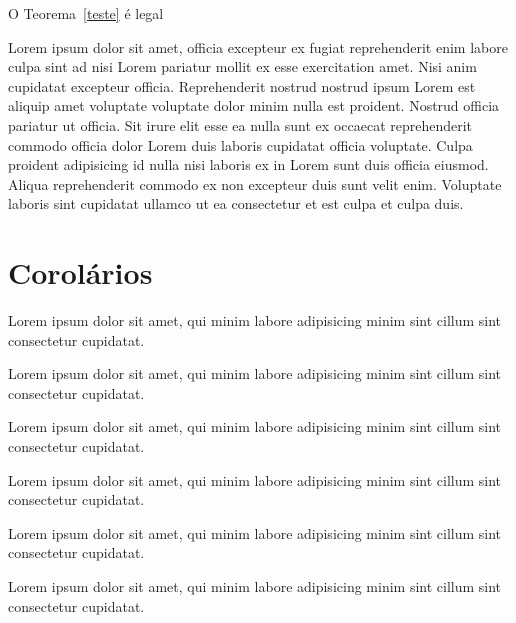 \documentclass[12pt]{../libellum}
\begin{document}
O Teorema~\ref{teste} é legal

 Lorem ipsum dolor sit amet, officia excepteur ex fugiat reprehenderit 
 enim labore culpa sint ad nisi Lorem pariatur mollit ex esse exercitation 
 amet. 
 Nisi anim cupidatat excepteur officia. 
 Reprehenderit nostrud nostrud ipsum Lorem est aliquip amet voluptate 
 voluptate dolor minim nulla est proident. 
 Nostrud officia pariatur ut officia. 
 Sit irure elit esse ea nulla sunt ex occaecat reprehenderit commodo 
 officia dolor Lorem duis laboris cupidatat officia voluptate. 
 Culpa proident adipisicing id nulla nisi laboris ex in Lorem sunt duis 
 officia eiusmod. 
 Aliqua reprehenderit commodo ex non excepteur duis sunt velit enim. 
 Voluptate laboris sint cupidatat ullamco ut ea consectetur et est culpa 
 et culpa duis.

 \section{Corolários} %

\begin{cor}
  Lorem ipsum dolor sit amet, qui minim labore adipisicing minim sint 
  cillum sint consectetur cupidatat.
\end{cor}

Lorem ipsum dolor sit amet, qui minim labore adipisicing minim sint cillum 
sint consectetur cupidatat.

\begin{lema}
  Lorem ipsum dolor sit amet, qui minim labore adipisicing minim sint 
  cillum sint consectetur cupidatat.
\end{lema}

\begin{teorema}
  Lorem ipsum dolor sit amet, qui minim labore adipisicing minim sint 
  cillum sint consectetur cupidatat.
\end{teorema}

Lorem ipsum dolor sit amet, qui minim labore adipisicing minim sint cillum 
sint consectetur cupidatat.

\begin{definicao}
  Lorem ipsum dolor sit amet, qui minim labore adipisicing minim sint 
  cillum sint consectetur cupidatat.
\end{definicao}
\end{document}
